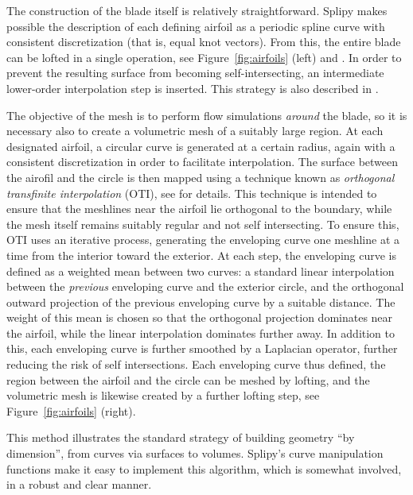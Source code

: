 \documentclass[preprint,12pt, a4paper]{elsarticle}
\begin{document}
The construction of the blade itself is relatively straightforward.
Splipy makes possible the description of each defining airfoil as a periodic spline curve with consistent discretization (that is, equal knot vectors).
From this, the entire blade can be lofted in a single operation, see Figure~\ref{fig:airfoils} (left) and \cite{Fonn2015sbm}.
In order to prevent the resulting surface from becoming self-intersecting, an intermediate lower-order interpolation step is inserted.
This strategy is also described in \cite{Fonn2015sbm}.

The objective of the mesh is to perform flow simulations \emph{around} the blade, so it is necessary also to create a volumetric mesh of a suitably large region.
At each designated airfoil, a circular curve is generated at a certain radius, again with a consistent discretization in order to facilitate interpolation.
The surface between the airofil and the circle is then mapped using a technique known as \emph{orthogonal transfinite interpolation} (OTI), see \cite{Fonn2015sbm} for details.
This technique is intended to ensure that the meshlines near the airfoil lie orthogonal to the boundary, while the mesh itself remains suitably regular and not self intersecting.
To ensure this, OTI uses an iterative process, generating the enveloping curve one meshline at a time from the interior toward the exterior.
At each step, the enveloping curve is defined as a weighted mean between two curves: a standard linear interpolation between the \emph{previous} enveloping curve and the exterior circle, and the orthogonal outward projection of the previous enveloping curve by a suitable distance.
The weight of this mean is chosen so that the orthogonal projection dominates near the airfoil, while the linear interpolation dominates further away.
In addition to this, each enveloping curve is further smoothed by a Laplacian operator, further reducing the risk of self intersections.
Each enveloping curve thus defined, the region between the airfoil and the circle can be meshed by lofting, and the volumetric mesh is likewise created by a further lofting step, see Figure~\ref{fig:airfoils} (right).

This method illustrates the standard strategy of building geometry ``by dimension'', from curves via surfaces to volumes.
Splipy's curve manipulation functions make it easy to implement this algorithm, which is somewhat involved, in a robust and clear manner.
\end{document}
